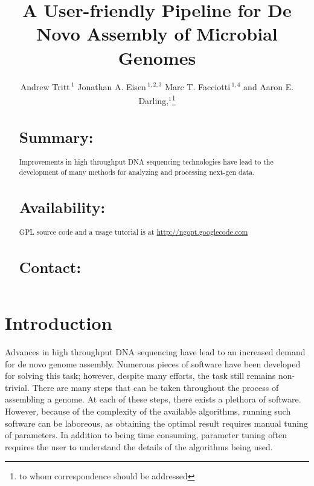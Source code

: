 \documentclass{bioinfo}
\begin{document}

\title[a5]{A User-friendly Pipeline for De Novo Assembly of Microbial Genomes}
\author[Tritt \textit{et~al}]{Andrew Tritt\,$^{1}$ Jonathan A. Eisen\,$^{1,2,3}$ Marc T. Facciotti\,$^{1,4}$ and Aaron E. Darling,$^{1}$\footnote{to whom correspondence should be addressed}}
\address{$^{1}$Genome Center, $^{2}$ Dept. of Evolution and Ecology, $^{3}$ Medical Microbiology and Immunology, 
$^{4}$ Biomedical Engineering, University of California-Davis, Davis, CA 95616.}



\maketitle

\begin{abstract}

\section{Summary:}
Improvements in high throughput DNA sequencing technologies have lead to the development of
many methods for analyzing and processing next-gen data. 
\section{Availability:}
GPL source code and a usage tutorial is at \href{http://ngopt.googlecode.com}{http://ngopt.googlecode.com}

\section{Contact:} \href{rabid apes}{}
\end{abstract}

\section{Introduction}
Advances in high throughput DNA sequencing have lead to an increased demand for de novo 
genome assembly. Numerous pieces of software have been developed for solving this task; 
however, despite many efforts, the task still remains non-trivial. There are many 
steps that can be taken throughout the process of assembling a genome. At each of these steps,
there exists a plethora of software. However, because of the complexity of the available algorithms,
running such software can be laboreous, as obtaining the optimal result requires manual tuning of parameters.
In addition to being time consuming, parameter tuning often requires the user to understand the details
of the algorithms being used. 
\end{document}
